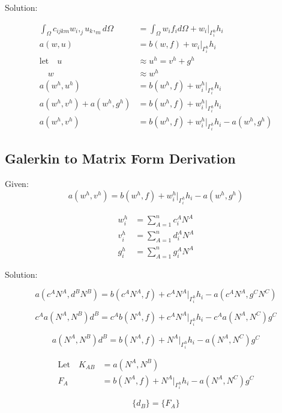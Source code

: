 \documentclass[a4paper, 12pt]{article}
\begin{document}
\noindent
Solution:

\begin{align*}
\int_{\Omega} c_{ijkm} w_{i},_{j} u_{k},_{m} d\Omega 
 &= \int_{\Omega} w_{i} f_{i} d\Omega
  + w_{i}\Big|_{\Gamma^{h}_{i}} h_{i} \\
a(w, u)
 &= b(w , f) 
  + w_{i}\Big|_{\Gamma^{h}_{i}} h_{i}  \\
\text{let} \quad u &\approx u^{h} = v^{h} + g^{h} \\
 \quad w &\approx w^{h} \\
a(w^{h} , u^{h} ) 
 &= b(w^{h}, f) 
  + w^{h}_{i}\Big|_{\Gamma^{h}_{i}} h_{i}  \\
a(w^{h} , v^{h} ) 
  + a(w^{h} , g^{h} ) 
 &= b(w^{h}, f) 
  + w^{h}_{i}\Big|_{\Gamma^{h}_{i}} h_{i}  \\
a(w^{h} , v^{h})
 &= b(w^{h} , f) 
  + w^{h}_{i}\Big|_{\Gamma^{h}_{i}} h_{i} 
  - a(w^{h} , g^{h})
\end{align*}

\newpage
\subsection{Galerkin to Matrix Form Derivation} \label{sec:MatrixDer}

Given:
\begin{equation*}
a(w^{h} , v^{h})
 = b(w^{h} , f) 
  + w^{h}_{i}\Big|_{\Gamma^{h}_{i}} h_{i} 
  - a(w^{h} , g^{h})
\end{equation*}

\begin{align*}
w^{h}_i &= \sum_{A=1}^{n} c^{A}_i N^{A}  \\
v^{h}_i &= \sum_{A=1}^{n} d^{A}_i N^{A}  \\
g^{h}_i &=  \sum_{A=1}^{n} g^{A}_i N^{A}
\end{align*}

\noindent
Solution:

\begin{equation*}
a(c^{A} N^{A}, d^{B} N^{B})
 = b( c^{A} N^{A} , f) 
  + c^{A} N^{A}\Big|_{\Gamma^{h}_{i}} h_{i} 
  - a( c^{A} N^{A}, g^{C} N^{C})
\end{equation*}

\begin{equation*}
c^{A} a(N^{A}, N^{B})d^{B} 
 = c^{A} b( N^{A} , f) 
  + c^{A} N^{A}\Big|_{\Gamma^{h}_{i}} h_{i} 
  - c^{A}a( N^{A}, N^{C})g^{C} 
\end{equation*}

\begin{equation*}
a(N^{A}, N^{B})d^{B} 
 = b( N^{A} , f) 
  + N^{A}\Big|_{\Gamma^{h}_{i}} h_{i} 
  - a( N^{A}, N^{C})g^{C} 
\end{equation*}

\begin{align*}
\text{Let}\quad K_{AB} &= a(N^{A}, N^{B}) \\
F_A &= b( N^{A} , f) 
  + N^{A}\Big|_{\Gamma^{h}_{i}} h_{i} 
  - a( N^{A}, N^{C})g^{C} 
\end{align*}

\begin{equation*}
[ K_{AB} ] \{ d_B \} = \{ F_A \} 
\end{equation*} 
\end{document}

